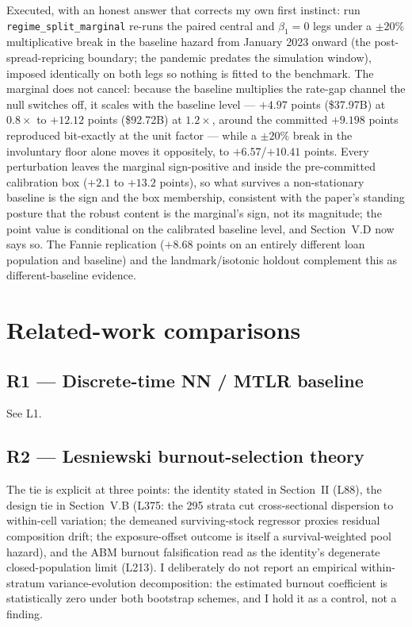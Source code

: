 \documentclass[11pt]{article}
\newcommand{\run}[1]{\texttt{#1}}
\begin{document}
Executed, with an honest answer that corrects my own first instinct: run
\run{regime\_split\_marginal} re-runs the paired central and $\beta_1=0$ legs
under a $\pm 20\%$ multiplicative break in the baseline hazard from January
2023 onward (the post-spread-repricing boundary; the pandemic predates the
simulation window), imposed identically on both legs so nothing is fitted to
the benchmark. The marginal does not cancel: because the baseline multiplies
the rate-gap channel the null switches off, it scales with the baseline level
--- $+4.97$ points (\$37.97B) at $0.8\times$ to $+12.12$ points (\$92.72B) at
$1.2\times$, around the committed $+9.198$ points reproduced bit-exactly at
the unit factor --- while a $\pm 20\%$ break in the involuntary floor alone
moves it oppositely, to $+6.57$/$+10.41$ points. Every perturbation leaves the
marginal sign-positive and inside the pre-committed calibration box ($+2.1$ to
$+13.2$ points), so what survives a non-stationary baseline is the sign and
the box membership, consistent with the paper's standing posture that the
robust content is the marginal's sign, not its magnitude; the point value is
conditional on the calibrated baseline level, and Section~V.D now says so. The
Fannie replication ($+8.68$ points on an entirely different loan population and
baseline) and the landmark/isotonic holdout complement this as
different-baseline evidence.

\section*{Related-work comparisons}

\subsection*{R1 --- Discrete-time NN / MTLR baseline}

See L1.

\subsection*{R2 --- Lesniewski burnout-selection theory}

The tie is explicit at three points: the identity stated in Section~II (L88),
the design tie in Section~V.B (L375: the 295 strata cut cross-sectional
dispersion to within-cell variation; the demeaned surviving-stock regressor
proxies residual composition drift; the exposure-offset outcome is itself a
survival-weighted pool hazard), and the ABM burnout falsification read as the
identity's degenerate closed-population limit (L213). I deliberately do not
report an empirical within-stratum variance-evolution decomposition: the
estimated burnout coefficient is statistically zero under both bootstrap
schemes, and I hold it as a control, not a finding.
\end{document}
